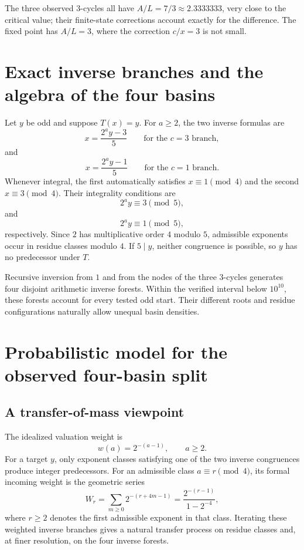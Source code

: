 \documentclass[11pt]{article}
\begin{document}
The three observed 3-cycles all have $A/L=7/3\approx2.3333333$, very close to the critical value; their finite-state corrections account exactly for the difference. The fixed point has $A/L=3$, where the correction $c/x=3$ is not small.

\section{Exact inverse branches and the algebra of the four basins}
Let $y$ be odd and suppose $T(x)=y$. For $a\ge2$, the two inverse formulas are
\begin{equation}
x=\frac{2^a y-3}{5}\qquad\text{for the }c=3\text{ branch},
\end{equation}
and
\begin{equation}
x=\frac{2^a y-1}{5}\qquad\text{for the }c=1\text{ branch}.
\end{equation}
Whenever integral, the first automatically satisfies $x\equiv1\pmod4$ and the second $x\equiv3\pmod4$. Their integrality conditions are
\begin{equation}
2^a y\equiv3\pmod5,
\end{equation}
and
\begin{equation}
2^a y\equiv1\pmod5,
\end{equation}
respectively. Since $2$ has multiplicative order $4$ modulo $5$, admissible exponents occur in residue classes modulo $4$. If $5\mid y$, neither congruence is possible, so $y$ has no predecessor under $T$.

Recursive inversion from $1$ and from the nodes of the three 3-cycles generates four disjoint arithmetic inverse forests. Within the verified interval below $10^{10}$, these forests account for every tested odd start. Their different roots and residue configurations naturally allow unequal basin densities.

\section{Probabilistic model for the observed four-basin split}
\subsection{A transfer-of-mass viewpoint}
The idealized valuation weight is
\[
w(a)=2^{-(a-1)},\qquad a\ge2.
\]
For a target $y$, only exponent classes satisfying one of the two inverse congruences produce integer predecessors. For an admissible class $a\equiv r\pmod4$, its formal incoming weight is the geometric series
\begin{equation}
W_r=\sum_{m\ge0}2^{-(r+4m-1)}=\frac{2^{-(r-1)}}{1-2^{-4}},
\end{equation}
where $r\ge2$ denotes the first admissible exponent in that class. Iterating these weighted inverse branches gives a natural transfer process on residue classes and, at finer resolution, on the four inverse forests.
\end{document}
